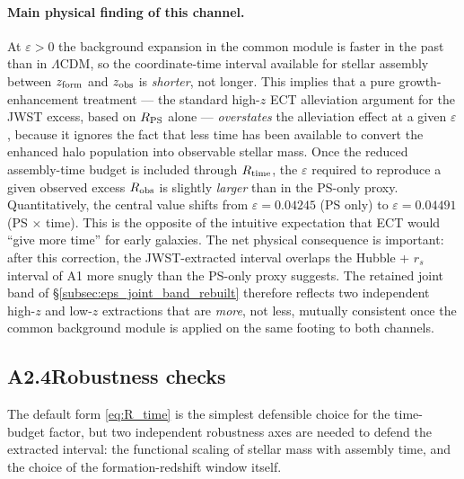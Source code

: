 \paragraph{Main physical finding of this channel.}
At $\varepsilon > 0$ the background expansion in the common module
is faster in the past than in $\Lambda$CDM, so the coordinate-time
interval available for stellar assembly between $z_{\rm form}$ and
$z_{\rm obs}$ is \emph{shorter}, not longer. This implies that a
pure growth-enhancement treatment --- the standard high-$z$ ECT
alleviation argument for the JWST excess, based on $R_{\rm PS}$
alone --- \emph{overstates} the alleviation effect at a given
$\varepsilon$, because it ignores the fact that less time has been
available to convert the enhanced halo population into observable
stellar mass. Once the reduced assembly-time budget is included
through $R_{\rm time}$, the $\varepsilon$ required to reproduce a
given observed excess $R_{\rm obs}$ is slightly \emph{larger} than
in the PS-only proxy. Quantitatively, the central value shifts
from $\varepsilon = 0.04245$ (PS only) to $\varepsilon = 0.04491$
(PS $\times$ time). This is the opposite of the intuitive
expectation that ECT would ``give more time'' for early galaxies.
The net physical consequence is important: after this correction,
the JWST-extracted interval overlaps the Hubble + $r_s$ interval
of A1 more snugly than the PS-only proxy suggests. The retained
joint band of \S\ref{subsec:eps_joint_band_rebuilt} therefore
reflects two independent high-$z$ and low-$z$ extractions that are
\emph{more}, not less, mutually consistent once the common
background module is applied on the same footing to both channels.

\subsection*{A2.4\quad Robustness checks}

The default form \eqref{eq:R_time} is the simplest defensible
choice for the time-budget factor, but two independent robustness
axes are needed to defend the extracted interval: the functional
scaling of stellar mass with assembly time, and the choice of the
formation-redshift window itself.

